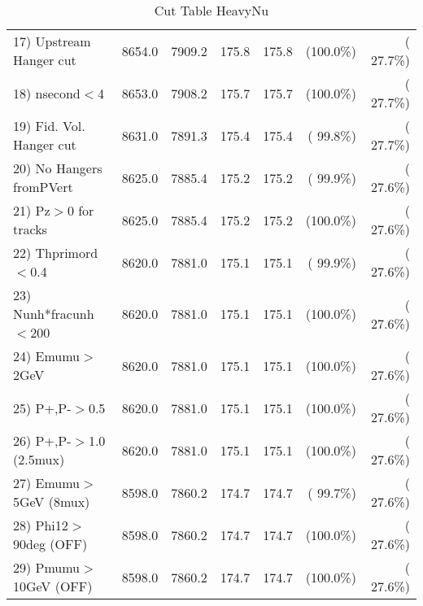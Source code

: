 \begin{table}[h!]
\begin{tabular}{||l||r|r|r|r|r|r||}
 17) Upstream Hanger cut  &       8654.0 &       7909.2 &        175.8 &        175.8 & (100.0\%) & ( 27.7\%) \\
 18) nsecond$<$4          &       8653.0 &       7908.2 &        175.7 &        175.7 & (100.0\%) & ( 27.7\%) \\
 19) Fid. Vol. Hanger cut &       8631.0 &       7891.3 &        175.4 &        175.4 & ( 99.8\%) & ( 27.7\%) \\
 20) No Hangers fromPVert &       8625.0 &       7885.4 &        175.2 &        175.2 & ( 99.9\%) & ( 27.6\%) \\
 21) Pz$>$0 for tracks    &       8625.0 &       7885.4 &        175.2 &        175.2 & (100.0\%) & ( 27.6\%) \\
 22) Thprimord$<$0.4      &       8620.0 &       7881.0 &        175.1 &        175.1 & ( 99.9\%) & ( 27.6\%) \\
 23) Nunh*fracunh$<$200   &       8620.0 &       7881.0 &        175.1 &        175.1 & (100.0\%) & ( 27.6\%) \\
 24) Emumu$>$2GeV         &       8620.0 &       7881.0 &        175.1 &        175.1 & (100.0\%) & ( 27.6\%) \\
 25) P+,P-$>$0.5          &       8620.0 &       7881.0 &        175.1 &        175.1 & (100.0\%) & ( 27.6\%) \\
 26) P+,P-$>$1.0 (2.5mux) &       8620.0 &       7881.0 &        175.1 &        175.1 & (100.0\%) & ( 27.6\%) \\
 27) Emumu$>$5GeV  (8mux) &       8598.0 &       7860.2 &        174.7 &        174.7 & ( 99.7\%) & ( 27.6\%) \\
 28) Phi12$>$90deg  (OFF) &       8598.0 &       7860.2 &        174.7 &        174.7 & (100.0\%) & ( 27.6\%) \\
 29) Pmumu$>$10GeV  (OFF) &       8598.0 &       7860.2 &        174.7 &        174.7 & (100.0\%) & ( 27.6\%) \\
 \hline
 \hline
 \end{tabular}
 \caption{Cut Table  HeavyNu  }
 \label{tab-cutheavy_neutrino}
 \end{table}

